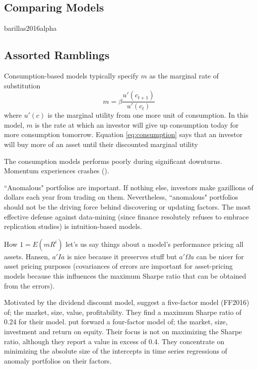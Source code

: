 \subsection{Comparing Models}

{barillas2016alpha}

\subsection{Assorted Ramblings}

Consumption-based models typically specify $m$ as the marginal rate of 
substitution
\begin{equation}
\label{eq:consumption}
m=\beta\frac{u'(c_{t+1})}{u'(c_t)}
\end{equation}
where $u'(c)$ is the marginal utility from one more unit of consumption.
In this model, $m$ is the rate at which an investor will give up consumption 
today for more consumption tomorrow.
Equation \ref{eq:consumption} says that an investor will buy more of an asset 
until their discounted marginal utility

The consumption models performs poorly during significant downturns.
Momentum experiences crashes (\parencite{daniel2016momentum}).

``Anomalous" portfolios are important.
If nothing else, investors make gazillions of dollars each year from trading 
on them.
Nevertheless, ``anomalous" portfolios should not be the driving force behind 
discovering or updating factors.
The most effective defense against data-mining (since finance resolutely 
refuses to embrace replication studies) is intuition-based models.

How $1=E(mR^i)$ let's us say things about a model's performance pricing all 
assets.
Hansen, $a'Ia$ is nice because it preserves stuff but
$a'\Omega a$ can be nicer for asset pricing purposes (covariances of errors 
are important for asset-pricing models because this influences the maximum 
Sharpe ratio that can be obtained from the errors).

Motivated by the dividend discount model, \textcite{fama2016choosing} 
suggest a five-factor model (FF2016) of; the market, size, value, 
profitability.
They find a maximum Sharpe ratio of 0.24 for their model.
\textcite{hou2015digesting} put forward a four-factor model of; the market, 
size, 
investment and return on equity.
Their focus is not on maximizing the Sharpe ratio, although they report a 
value in excess of 0.4.
They concentrate on minimizing the absolute size of the intercepts in time 
series regressions of anomaly portfolios on their factors.

